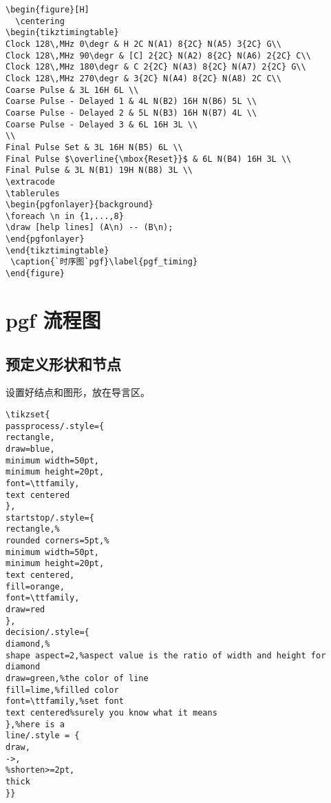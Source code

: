 \begin{lstlisting}
\begin{figure}[H]
  \centering
\begin{tikztimingtable}
Clock 128\,MHz 0\degr & H 2C N(A1) 8{2C} N(A5) 3{2C} G\\
Clock 128\,MHz 90\degr & [C] 2{2C} N(A2) 8{2C} N(A6) 2{2C} C\\
Clock 128\,MHz 180\degr & C 2{2C} N(A3) 8{2C} N(A7) 2{2C} G\\
Clock 128\,MHz 270\degr & 3{2C} N(A4) 8{2C} N(A8) 2C C\\
Coarse Pulse & 3L 16H 6L \\
Coarse Pulse - Delayed 1 & 4L N(B2) 16H N(B6) 5L \\
Coarse Pulse - Delayed 2 & 5L N(B3) 16H N(B7) 4L \\
Coarse Pulse - Delayed 3 & 6L 16H 3L \\
\\
Final Pulse Set & 3L 16H N(B5) 6L \\
Final Pulse $\overline{\mbox{Reset}}$ & 6L N(B4) 16H 3L \\
Final Pulse & 3L N(B1) 19H N(B8) 3L \\
\extracode
\tablerules
\begin{pgfonlayer}{background}
\foreach \n in {1,...,8}
\draw [help lines] (A\n) -- (B\n);
\end{pgfonlayer}
\end{tikztimingtable}
 \caption{`时序图`pgf}\label{pgf_timing}
\end{figure}
\end{lstlisting}

\tikzexternalenable

\section{pgf 流程图}

\subsection{预定义形状和节点}
设置好结点和图形，放在导言区。
\begin{lstlisting}
\tikzset{
passprocess/.style={
rectangle,
draw=blue,
minimum width=50pt,
minimum height=20pt,
font=\ttfamily,
text centered
},
startstop/.style={
rectangle,%
rounded corners=5pt,%
minimum width=50pt,
minimum height=20pt,
text centered,
fill=orange,
font=\ttfamily,
draw=red
},
decision/.style={
diamond,%
shape aspect=2,%aspect value is the ratio of width and height for diamond
draw=green,%the color of line
fill=lime,%filled color
font=\ttfamily,%set font
text centered%surely you know what it means
},%here is a
line/.style = {
draw,
->,
%shorten>=2pt,
thick
}}
\end{lstlisting}

